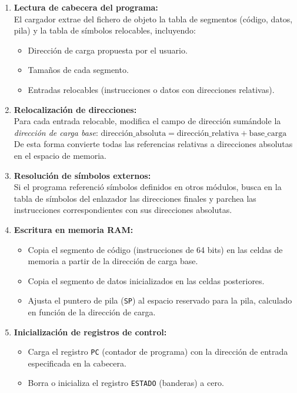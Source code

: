 \documentclass{article}
\begin{document}
\begin{enumerate}
  \item \textbf{Lectura de cabecera del programa:}\\
        El cargador extrae del fichero de objeto la tabla de segmentos (código, datos, pila) y la tabla de símbolos relocables, incluyendo:
        \begin{itemize}
          \item Dirección de carga propuesta por el usuario.
          \item Tamaños de cada segmento.
          \item Entradas relocables (instrucciones o datos con direcciones relativas).
        \end{itemize}

  \item \textbf{Relocalización de direcciones:}\\
        Para cada entrada relocable, modifica el campo de dirección sumándole la \emph{dirección de carga base}:
        $       \text{dirección\_absoluta} = \text{dirección\_relativa} + \text{base\_carga}
        $
        De esta forma convierte todas las referencias relativas a direcciones absolutas en el espacio de memoria.

  \item \textbf{Resolución de símbolos externos:}\\
        Si el programa referenció símbolos definidos en otros módulos, busca en la tabla de símbolos del enlazador las direcciones finales y parchea las instrucciones correspondientes con sus direcciones absolutas.

  \item \textbf{Escritura en memoria RAM:}\\
        \begin{itemize}
          \item Copia el segmento de código (instrucciones de 64 bits) en las celdas de memoria a partir de la dirección de carga base.
          \item Copia el segmento de datos inicializados en las celdas posteriores.
          \item Ajusta el puntero de pila (\texttt{SP}) al espacio reservado para la pila, calculado en función de la dirección de carga.
        \end{itemize}

  \item \textbf{Inicialización de registros de control:}\\
        \begin{itemize}
          \item Carga el registro \texttt{PC} (contador de programa) con la dirección de entrada especificada en la cabecera.
          \item Borra o inicializa el registro \texttt{ESTADO} (banderas) a cero.
        \end{itemize}


\end{enumerate}
\end{document}
